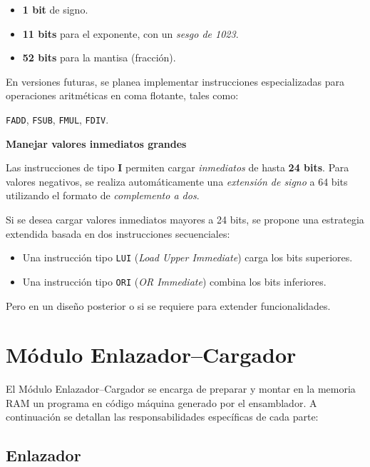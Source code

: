 \documentclass{article}
\begin{document}
\begin{itemize}
  \item \textbf{1 bit} de signo.
  \item \textbf{11 bits} para el exponente, con un \textit{sesgo de 1023}.
  \item \textbf{52 bits} para la mantisa (fracción).
\end{itemize}

En versiones futuras, se planea implementar instrucciones especializadas para operaciones aritméticas en coma flotante, tales como:

\texttt{FADD}, \texttt{FSUB}, \texttt{FMUL}, \texttt{FDIV}.

\textbf{Manejar valores inmediatos grandes}

Las instrucciones de tipo \textbf{I} permiten cargar \textit{inmediatos} de hasta \textbf{24 bits}.
Para valores negativos, se realiza automáticamente una \textit{extensión de signo}
a 64 bits utilizando el formato de \textit{complemento a dos}.

Si se desea cargar valores inmediatos mayores a 24 bits, se propone una
estrategia extendida basada en dos instrucciones secuenciales:

\begin{itemize}
  \item Una instrucción tipo \texttt{LUI} (\textit{Load Upper Immediate}) carga los bits superiores.
  \item Una instrucción tipo \texttt{ORI} (\textit{OR Immediate}) combina los bits inferiores.
\end{itemize}

Pero en un diseño posterior o si se requiere para extender funcionalidades.




\section{Módulo Enlazador–Cargador}

El Módulo Enlazador–Cargador se encarga de preparar y montar en la memoria RAM un programa en código máquina generado por el ensamblador. A continuación se detallan las responsabilidades específicas de cada parte:
\subsection{Enlazador}
\end{document}
